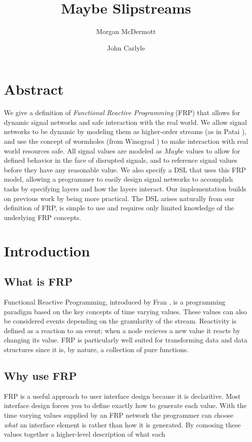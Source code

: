 \documentclass[twocolumn]{paper}
\title{Maybe Slipstreams}
\author[*]{Morgan McDermott}
\author[*]{John Carlyle}
\affil[*]{University of flightless dragons}
\begin{document}
\maketitle

\section{Abstract}
We give a definition of \textit{Functional Reactive Programming} (FRP) that allows for dynamic signal networks and safe interaction with the real world. We allow signal networks to be dynamic by modeling them as higher-order streams (as in Patai \cite{HighOrderStreams}), and use the concept of wormholes (from Winograd \cite{WinogradCort2012HS}) to make interaction with real world resources safe. All signal values are modeled as $Maybe$ values to allow for defined behavior in the face of disrupted signals, and to reference signal values before they have any reasonable value. We also specify a DSL that uses this FRP model, allowing a programmer to easily design signal networks to accomplish tasks by specifying layers and how the layers interact. Our implementation builds on previous work by being more practical. The DSL arises naturally from our definition of FRP, is simple to use and requires only limited knowledge of the underlying FRP concepts.

\section{Introduction}
\subsection{What is FRP}
Functional Reactive Programming, introduced by Fran \cite{ElliottHudak97:Fran}, is a programming paradigm based on the key concepts of time varying values.   These values can also be considered events depending on the granularity of the stream. Reactivity is defined as a reaction to an event; when a node recieves a new value it reacts by changing its value. FRP is particularly well suited for transforming data and data structures since it is, by nature, a collection of pure functions. 

\subsection{Why use FRP}
FRP is a useful approach to user interface design because it is declaritive. Most interface design forces you to define exactly how to generate each value. With the time varying values supplied by an FRP network the programmer can choose \textit{what} an interface element is rather than how it is generated. By comosing these values together a higher-level description of what each 
\end{document}
